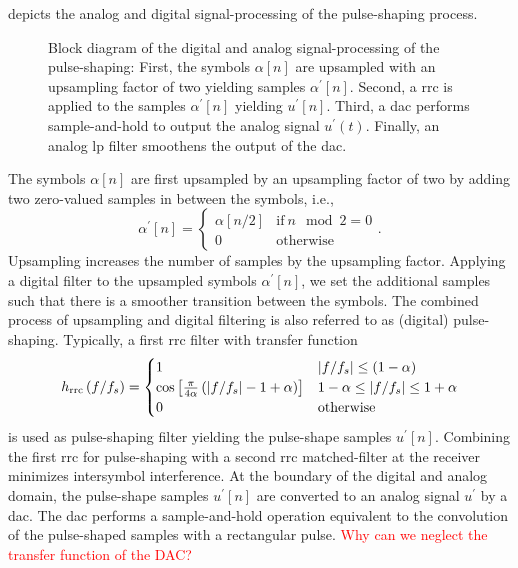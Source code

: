  depicts the analog and digital signal-processing of the pulse-shaping process.
\begin{figure}[htb]
	\centering
	
	\caption{Block diagram of the digital and analog signal-processing of the pulse-shaping: First, the symbols $\alpha[n]$ are upsampled with an upsampling factor of two yielding samples $\alpha^\prime[n]$. Second, a \gls{rrc} is applied to the samples $\alpha^\prime[n]$ yielding $u^\prime[n]$. Third, a \gls{dac} performs sample-and-hold to output the analog signal $u^\prime(t)$. Finally, an analog \gls{lp} filter smoothens the output of the \gls{dac}.}\label{fig:pulse_shaping_block}
\end{figure}
The symbols $\alpha[n]$ are first upsampled by an upsampling factor of two by adding two zero-valued samples in between the symbols, i.e.,
\begin{equation}
	\alpha^\prime[n]
	=
	\begin{cases}
		\alpha[n/2] & \text{if}\ n\mod2=0 \\
		0 & \text{otherwise}
	\end{cases}
	.
\end{equation}
Upsampling increases the number of samples by the upsampling factor.
Applying a digital filter to the upsampled symbols $\alpha^\prime[n]$, we set the additional samples such that there is a smoother transition between the symbols.
The combined process of upsampling and digital filtering is also referred to as (digital) pulse-shaping.
Typically, a first \gls{rrc} filter with transfer function~\cite[p.~33]{Nossek2015}
\begin{equation}
	h_\text{rrc}\left(f/f_s\right)
	=
	\begin{cases}
		1 & \abs{f/f_s}\leq(1-\alpha) \\
		\cos\left[\frac{\pi}{4\alpha}\left(\abs{f/f_s}-1+\alpha\right)\right] & 1-\alpha\leq\abs{f/f_s}\leq1+\alpha \\
		0 & \text{otherwise}
	\end{cases}
\end{equation}
is used as pulse-shaping filter yielding the pulse-shape samples $u^\prime[n]$.
Combining the first \gls{rrc} for pulse-shaping with a second \gls{rrc} matched-filter at the receiver minimizes intersymbol interference.
At the boundary of the digital and analog domain, the pulse-shape samples $u^\prime[n]$ are converted to an analog signal $u^\prime$ by a \gls{dac}.
The \gls{dac} performs a sample-and-hold operation equivalent to the convolution of the pulse-shaped samples with a rectangular pulse.
\textcolor{red}{Why can we neglect the transfer function of the DAC?}

